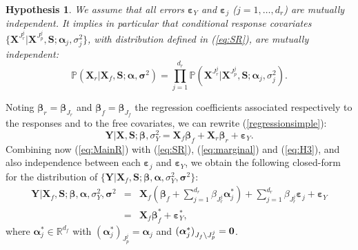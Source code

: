 \documentclass[12pt,a4paper]{report}
\newtheorem{hyp}{Hypothesis}
\begin{document}
\begin{hyp}\label{H3}
We assume that all errors $\boldsymbol{\varepsilon}_Y$ and $\boldsymbol{\varepsilon}_j$ ($j=1,\ldots,d_r$) are {\it mutually independent}. It implies in particular that conditional response covariates $\{\boldsymbol{X}^{J_{r}^j}|\boldsymbol{X}^{J_{p}^j},\boldsymbol{S};\boldsymbol{\alpha}_j,\sigma^2_j\}$, with distribution defined in (\ref{eq:SR}), are {\it mutually independent}:
\begin{equation}\label{eq:H3}
\mathbb{P}(\boldsymbol{X}_r | \boldsymbol{X}_f,\boldsymbol{S};\boldsymbol{\alpha},\boldsymbol{\sigma}^2) = \prod_{j=1}^{d_r} \mathbb{P}(\boldsymbol{X}^{J_{r}^j}|\boldsymbol{X}^{J_{p}^j},\boldsymbol{S};\boldsymbol{\alpha}_j,\sigma^2_j).
\end{equation}
\end{hyp}

\vspace{3mm}

Noting $\boldsymbol{\beta}_r=\boldsymbol{\beta}_{J_r}$ and $\boldsymbol{\beta}_f=\boldsymbol{\beta}_{J_f}$ the regression coefficients associated respectively to the responses and to the free covariates, we can rewrite (\ref{regressionsimple}):
\begin{equation}
			\boldsymbol{Y}{|\boldsymbol{X},\boldsymbol{S}};\boldsymbol{\beta},\sigma_Y^2=\boldsymbol{X}_f\boldsymbol{\beta}_f+\boldsymbol{X}_r\boldsymbol{\beta}_r+\boldsymbol{\varepsilon}_Y. \label{eq:MainR}
\end{equation}
Combining now (\ref{eq:MainR}) with (\ref{eq:SR}), (\ref{eq:marginal}) and (\ref{eq:H3}), and also independence between each $\boldsymbol{\varepsilon}_j$ and $\boldsymbol{\varepsilon}_Y$, we obtain the following closed-form for the distribution of $\{\boldsymbol{Y} |\boldsymbol{X}_f,\boldsymbol{S};\boldsymbol{\beta},\boldsymbol{\alpha},\sigma_Y^2,\boldsymbol{\sigma}^2\}$:
\begin{eqnarray}
	\boldsymbol{Y}|\boldsymbol{X}_f,\boldsymbol{S};\boldsymbol{\beta},\boldsymbol{\alpha},\sigma_Y^2,\boldsymbol{\sigma}^2&=&\boldsymbol{X}_f (\boldsymbol{\beta}_f+ \sum_{j =1}^{d_r}\beta_{J_r^j}\boldsymbol{\alpha}_j^*)+  \sum_{j =1}^{d_r}\beta_{J_r^j}\boldsymbol{\varepsilon}_j+\boldsymbol{\varepsilon}_Y \label{eq:Trueexpl} \\
	&=&\boldsymbol{X}_f\boldsymbol{\beta}_f^*+\boldsymbol{\varepsilon}_Y^*,\label{eq:modexpl}
\end{eqnarray}
where $\boldsymbol{\alpha}^*_j \in \mathbb{R}^{d_f}$ with $(\boldsymbol{\alpha}_j^*)_{J_p^j}=\boldsymbol{\alpha}_j $ and $(\boldsymbol{\alpha}_j^*)_{J_f\setminus J_p^j}=\bf 0  $. \\
\end{document}
